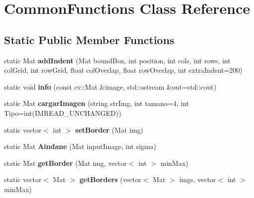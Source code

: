 \hypertarget{classCommonFunctions}{}\section{Common\+Functions Class Reference}
\label{classCommonFunctions}
\subsection*{Static Public Member Functions}
\begin{DoxyCompactItemize}
\item 
\mbox{\label{classCommonFunctions_a7929553dc4f6c186d0b47c4df99d8277}} 
static Mat {\bfseries add\+Indent} (Mat bound\+Box, int position, int cols, int rows, int col\+Grid, int row\+Grid, float col\+Overlap, float row\+Overlap, int extra\+Indent=200)
\item 
\mbox{\label{classCommonFunctions_a51a3e18bdcc2c918ebc81f0cc1f47851}} 
static void {\bfseries info} (const cv\+::\+Mat \&image, std\+::ostream \&out=std\+::cout)
\item 
\mbox{\label{classCommonFunctions_afd243765a93b61f26d97467a72838ff9}} 
static Mat {\bfseries cargar\+Imagen} (string str\+Img, int tamano=4, int Tipo=int(I\+M\+R\+E\+A\+D\+\_\+\+U\+N\+C\+H\+A\+N\+G\+ED))
\item 
\mbox{\label{classCommonFunctions_ae99903337e2288caf5e685162491cdb0}} 
static vector$<$ int $>$ {\bfseries set\+Border} (Mat img)
\item 
\mbox{\label{classCommonFunctions_a8fbb5de9311cca7ee8dec4d4afaab6ff}} 
static Mat {\bfseries Aindane} (Mat input\+Image, int sigma)
\item 
\mbox{\label{classCommonFunctions_a12aab213d05635ce869cfc70a72be43d}} 
static Mat {\bfseries get\+Border} (Mat img, vector$<$ int $>$ min\+Max)
\item 
\mbox{\label{classCommonFunctions_a796534c3ac4d0dfb260d29af60e620ee}} 
static vector$<$ Mat $>$ {\bfseries get\+Borders} (vector$<$ Mat $>$ imgs, vector$<$ int $>$ min\+Max)
\item 

\end{DoxyCompactItemize}
